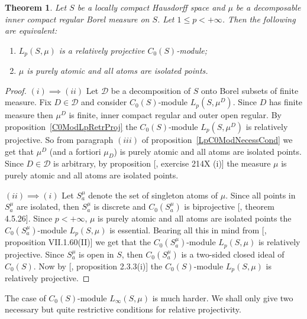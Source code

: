 \documentclass[12pt]{article}
\newtheorem{theorem}{Theorem}[section]
\begin{document}
\begin{theorem}\label{ReflLpC0ModCrit} Let $S$ be a locally compact Hausdorff
    space and $\mu$ be a decomposable inner compact regular Borel measure on
    $S$. Let $1\leq p< +\infty$. Then the following are equivalent:
    \begin{enumerate}[label = (\roman*)]
        \item $L_p(S,\mu)$ is a relatively projective $C_0(S)$-module;
        \item $\mu$ is purely atomic and all atoms are isolated points.
    \end{enumerate}
\end{theorem}
\begin{proof} $(i)\implies (ii)$ Let $\mathcal{D}$ be a decomposition of $S$
    onto Borel subsets of finite measure. Fix $D\in\mathcal{D}$ and consider
    $C_0(S)$-module $L_p(S,\mu^D)$. Since $D$ has finite measure then $\mu^D$ is
    finite, inner compact regular and outer open regular. By
    proposition~\ref{C0ModLpRetrProj} the $C_0(S)$-module $L_p(S,\mu^D)$ is
    relatively projective. So from paragraph $(iii)$ of
    proposition~\ref{LpC0ModNecessCond} we get that $\mu^D$ (and a fortiori
    $\mu_D$) is purely atomic and all atoms are isolated points. Since
    $D\in\mathcal{D}$ is arbitrary, by proposition [\cite{FremMeasTh2}, exercise
            214X (i)] the measure $\mu$ is purely atomic and all atoms are isolated
    points.

    $(ii)\implies (i)$ Let $S_a^\mu$ denote the set of singleton atoms of $\mu$.
    Since all points in $S_a^\mu$ are isolated, then $S_a^\mu$ is discrete and
    $C_0(S_a^\mu)$ is biprojective [\cite{HelHomolBanTopAlg}, theorem 4.5.26].
    Since $p<+\infty$, $\mu$ is purely atomic and all atoms are isolated points
    the $C_0(S_a^\mu)$-module $L_p(S,\mu)$ is  essential. Bearing all this in
    mind from [\cite{HelBanLocConvAlg}, proposition VII.1.60(II)] we get that
    the $C_0(S_a^\mu)$-module $L_p(S,\mu)$ is relatively projective. Since
    $S_a^\mu$ is open in $S$, then $C_0(S_a^\mu)$ is a two-sided closed ideal of
    $C_0(S)$. Now by [\cite{RamsHomPropSemgroupAlg}, proposition 2.3.3(i)] the
    $C_0(S)$-module $L_p(S,\mu)$ is relatively projective.
\end{proof}

The case of $C_0(S)$-module $L_\infty(S,\mu)$ is much harder. We shall only give
two necessary but quite restrictive conditions for relative projectivity.
\end{document}
